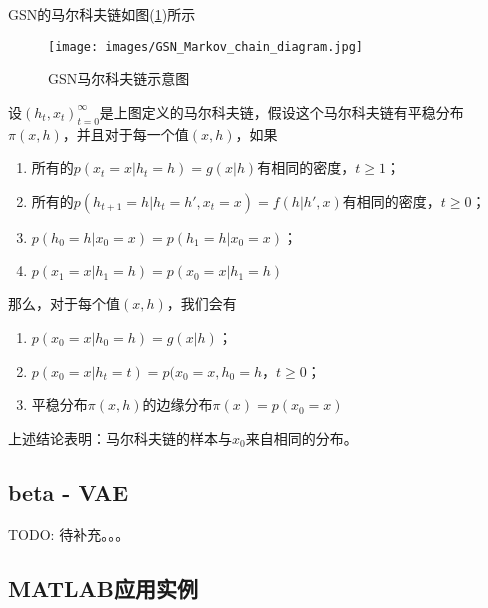         \par
        GSN的马尔科夫链如图(\ref{fig:GSN马尔科夫链示意图})所示
            \begin{figure}[H]
            \centering
            \texttt{[image: images/GSN\_Markov\_chain\_diagram.jpg]}
            \caption{GSN马尔科夫链示意图}
            \label{fig:GSN马尔科夫链示意图}
            \end{figure}
        \begin{theorem}
        设$(h_t,x_t)_{t=0}^\infty$是上图定义的马尔科夫链，假设这个马尔科夫链有平稳分布$\pi(x,h)$，并且对于每一个值$(x,h)$，如果
        \begin{enumerate}
        \item 所有的$p(x_t=x|h_t=h) = g(x|h)$有相同的密度，$t \geqslant 1$；
        \item 所有的$p(h_{t+1}=h|h_t=h',x_t=x) = f(h|h',x)$有相同的密度，$t \geqslant0 $；
        \item $p(h_0=h|x_0=x) = p(h_1=h|x_0=x)$；
        \item $p(x_1=x|h_1=h) = p(x_0=x|h_1=h)$
        \end{enumerate}
        那么，对于每个值$(x,h)$，我们会有
        \begin{enumerate}
        \item $p(x_0=x|h_0=h) = g(x|h)$；
        \item $p(x_0=x|h_t=t)=p(x_0=x,h_0=h$，$t \geqslant 0$；
        \item 平稳分布$\pi(x,h)$的边缘分布$\pi(x) = p(x_0 = x)$
        \end{enumerate}
        \end{theorem}
        上述结论表明：马尔科夫链的样本与$x_0$来自相同的分布。
    \subsection{beta - VAE}
        TODO: 待补充。。。
    \subsection{MATLAB应用实例}
